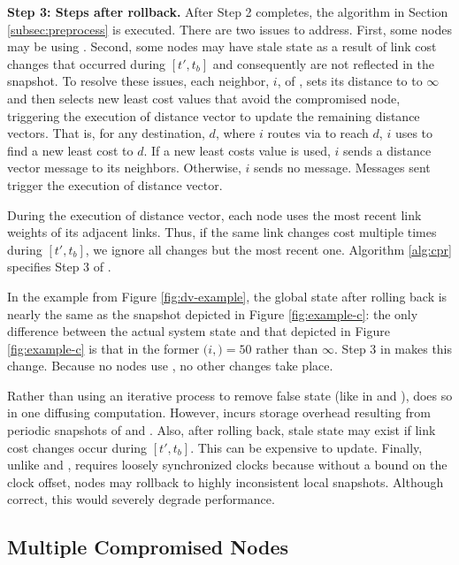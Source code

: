 {\bf Step 3: Steps after rollback.} After Step 2 completes, the algorithm in Section \ref{subsec:preprocess} is executed.
There are two issues to address.
First, some nodes may be using \oldvectors.  Second, some nodes may have stale state as a result of link cost changes that occurred during $[t',t_b]$ and 
consequently are not reflected in the snapshot. 
To resolve these issues, each neighbor, $i$, of \bads, sets its distance to \bad to $\infty$ and then selects new least cost values that avoid the compromised node, triggering
the execution of distance vector to update the remaining distance vectors.  That is, for any destination, $d$, where $i$ routes via \bad to reach $d$,
$i$ uses \dmatrixi to find a new least cost to $d$. If a new least costs value is used, $i$ sends a distance vector message to its neighbors. Otherwise, $i$ sends no message.
Messages sent trigger the execution of distance vector.

During the execution of distance vector, each node uses the most recent link weights of its adjacent links. Thus, 
if the same link changes cost multiple times during  $[t',t_b]$, we ignore all changes but the most recent one. Algorithm \ref{alg:cpr} specifies Step 3 of \cprs.

In the example from Figure \ref{fig:dv-example}, the global state after rolling back is nearly the same as the snapshot depicted in Figure \ref{fig:example-c}:
the only difference between the actual system state and that depicted in Figure \ref{fig:example-c} is that in the former 
$(i,$\bads$)=50$ rather than $\infty$. Step 3 in \cpr makes this change.  Because no nodes use \oldvectors, no other changes take place.

Rather than using an iterative process to remove false state (like in \second and \purges), \cpr does so in one diffusing computation.
However, \cpr incurs storage overhead resulting from periodic snapshots of \minv and \dmatrixs.  Also, after rolling back, stale state may exist if link cost changes occur during $[t',t_b]$.
This can be expensive to update.
Finally, unlike \purge and \seconds, \cpr requires loosely synchronized clocks because without a bound on the clock offset, nodes may rollback to highly inconsistent local snapshots.
Although correct, this would severely degrade \cpr performance.

\subsection{Multiple Compromised Nodes}
\label{subsec:mult}


